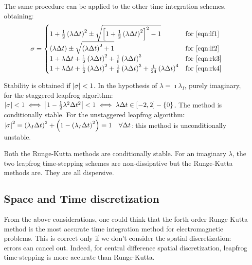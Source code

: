 The same procedure can be applied to the other time integration
schemes, obtaining:
\begin{equation} \label{eqn:sigma}
  \sigma = \begin{cases}
    1+\frac{1}{2} \left( \lambda \Delta t \right)^2 \pm \sqrt{\left[ 1
    + \frac{1}{2} \left( \lambda \Delta t \right)^2 \right]^2 - 1} &
    \text{for \eqref{eqn:lf1}} \\
    \left( \lambda \Delta t \right) \pm \sqrt{\left( \lambda \Delta t \right)^2 + 1} &
    \text{for \eqref{eqn:lf2}} \\
    1+ \lambda \Delta t + \frac{1}{2} \left( \lambda \Delta t \right)^2
    + \frac{1}{6} \left( \lambda \Delta t \right)^3 & \text{for \eqref{eqn:rk3}} \\
    1+ \lambda \Delta t + \frac{1}{2} \left( \lambda \Delta t \right)^2
    + \frac{1}{6} \left( \lambda \Delta t \right)^3 + \frac{1}{24}
    \left( \lambda \Delta t \right)^4 & \text{for \eqref{eqn:rk4}}
  \end{cases}
\end{equation}

Stability is obtained if ${\left\lvert\sigma\right\rvert} < 1$. In the hypothesis of
$\lambda = \imath \lambda_I$, purely imaginary, for the staggered
leapfrog algorithm: ${\left\lvert\sigma\right\rvert} < 1 \iff {\left\lvert1 - \frac{1}{2}
\lambda^2 \Delta t^2\right\rvert} < 1 \iff \lambda \Delta t \in \left[ -2, 2 \right]
- \left\{ 0 \right\}$. The method is conditionally stable. For the
unstaggered leapfrog algorithm: ${\left\lvert\sigma\right\rvert}^2 = \left( \lambda_I
\Delta t \right)^2 + \left( 1 - \left( \lambda_I \Delta t \right)^2
\right) = 1 \quad \forall \Delta t$: this method is unconditionally
unstable.

Both the Runge-Kutta methods are conditionally stable. For an imaginary
$\lambda$, the two leapfrog time-stepping schemes are non-dissipative
but the Runge-Kutta methods are. They are all dispersive.

\subsection{Space and Time discretization}

From the above considerations, one could think that the forth order
Runge-Kutta method is the most accurate time integration method for
electromagnetic problems. This is correct only if we don't consider
the spatial discretization: errors can cancel out. Indeed, for central
difference spatial discretization, leapfrog time-stepping is more
accurate than Runge-Kutta.

